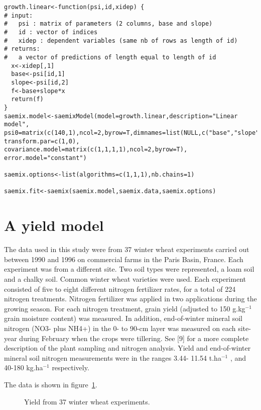 {\begin{verbatim}
growth.linear<-function(psi,id,xidep) {
# input:
#   psi : matrix of parameters (2 columns, base and slope)
#   id : vector of indices 
#   xidep : dependent variables (same nb of rows as length of id)
# returns:
#   a vector of predictions of length equal to length of id
  x<-xidep[,1]
  base<-psi[id,1]
  slope<-psi[id,2]
  f<-base+slope*x
  return(f)
}
saemix.model<-saemixModel(model=growth.linear,description="Linear model", 
psi0=matrix(c(140,1),ncol=2,byrow=T,dimnames=list(NULL,c("base","slope"))),  
transform.par=c(1,0), covariance.model=matrix(c(1,1,1,1),ncol=2,byrow=T), 
error.model="constant")

saemix.options<-list(algorithms=c(1,1,1),nb.chains=1)

saemix.fit<-saemix(saemix.model,saemix.data,saemix.options)
\end{verbatim}


\par \kern -0.5cm
\section{A yield model} \label{sec:exampleyield}

The data used in this study were from 37 winter wheat experiments carried out between 1990 and 1996 on commercial farms in the Paris Basin, France. Each experiment was from a different site. Two soil types were represented, a loam soil and a chalky soil. Common winter wheat varieties were used. Each experiment consisted of five to eight different nitrogen fertilizer rates, for a total of 224 nitrogen treatments. Nitrogen fertilizer was applied in two applications during the growing season. For each nitrogen treatment, grain yield (adjusted to 150 g.kg$^{-1}$ grain moisture content) was measured. In addition, end-of-winter mineral soil nitrogen (NO3- plus NH4+) in the 0- to 90-cm layer was measured on each site-year during February when the crops were tillering. See [9] for a more complete description of the plant sampling and nitrogen analysis. Yield and end-of-winter mineral soil nitrogen measurements were in the ranges 3.44- 11.54 t.ha$^{-1}$ , and 40-180 kg.ha$^{-1}$ respectively.

The data is shown in figure~\ref{fig:yielddata}.
\begin{figure}[!h]
\begin{center}
\par \kern -1cm
\end{center}
\par \kern -0.5cm
\caption{Yield from 37 winter wheat experiments.} \label{fig:yielddata}
\end{figure}

}
